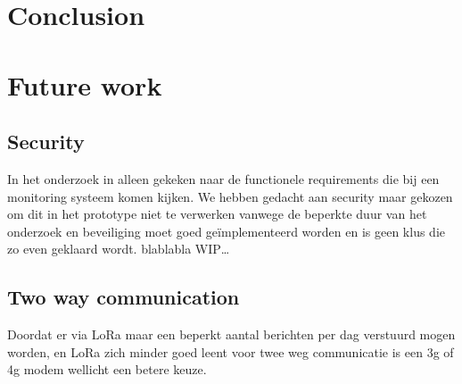 \documentclass{below-ext}
\begin{document}
\section{Conclusion}

\section{Future work}
\subsection{Security}
In het onderzoek in alleen gekeken naar de functionele requirements die bij een monitoring systeem komen kijken. We hebben gedacht aan security maar gekozen om dit in het prototype niet te verwerken vanwege de beperkte duur van het onderzoek en beveiliging moet goed geïmplementeerd worden en is geen klus die zo even geklaard wordt. blablabla WIP\ldots
\subsection{Two way communication}
Doordat er via LoRa maar een beperkt aantal berichten per dag verstuurd mogen worden, en LoRa zich minder goed leent voor twee weg communicatie is een 3g of 4g modem wellicht een betere keuze.
\balance


\end{document}
